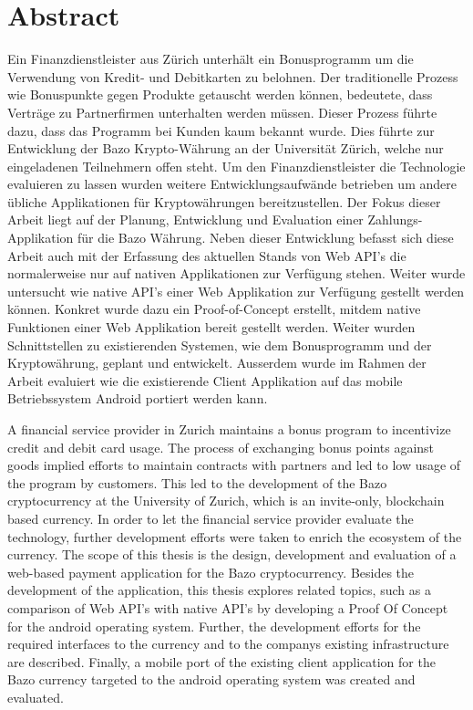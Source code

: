 \chapter*{Abstract}

Ein Finanzdienstleister aus Zürich unterhält ein Bonusprogramm um die Verwendung von Kredit- und Debitkarten zu belohnen. Der traditionelle Prozess wie Bonuspunkte gegen Produkte getauscht werden können, bedeutete, dass Verträge zu Partnerfirmen unterhalten werden müssen. Dieser Prozess führte dazu, dass das Programm bei Kunden kaum bekannt wurde. Dies führte zur Entwicklung der Bazo Krypto-Währung an der Universität Zürich, welche nur eingeladenen Teilnehmern offen steht. Um den Finanzdienstleister die Technologie evaluieren zu lassen wurden weitere Entwicklungsaufwände betrieben um andere übliche Applikationen für Kryptowährungen bereitzustellen. Der Fokus dieser Arbeit liegt auf der Planung, Entwicklung und Evaluation einer Zahlungs-Applikation für die Bazo Währung. Neben dieser Entwicklung befasst sich diese Arbeit auch mit der Erfassung des aktuellen Stands von Web API's die normalerweise nur auf nativen Applikationen zur Verfügung stehen. Weiter wurde untersucht wie native API's einer Web Applikation zur Verfügung gestellt werden können. Konkret wurde dazu ein Proof-of-Concept erstellt, mitdem native Funktionen einer Web Applikation bereit gestellt werden. Weiter wurden Schnittstellen zu existierenden Systemen, wie dem Bonusprogramm und der Kryptowährung, geplant und entwickelt. Ausserdem wurde im Rahmen der Arbeit evaluiert wie die existierende Client Applikation auf das mobile Betriebssystem Android portiert werden kann.

A financial service provider in Zurich maintains a bonus program to incentivize credit and debit card usage. The process of exchanging bonus points against goods implied efforts to maintain contracts with partners and led to low usage of the program by customers. This led to the development of the Bazo cryptocurrency at the University of Zurich, which is an invite-only, blockchain based currency. In order to let the financial service provider evaluate the technology, further development efforts were taken to enrich the ecosystem of the currency. The scope of this thesis is the design, development and evaluation of a web-based payment application for the Bazo cryptocurrency. Besides the development of the application, this thesis explores related topics, such as a comparison of Web API's with native API's by developing a Proof Of Concept for the android operating system. Further, the development efforts for the required interfaces to the currency and to the companys existing infrastructure are described. Finally, a mobile port of the existing client application for the Bazo currency targeted to the android operating system was created and evaluated.

